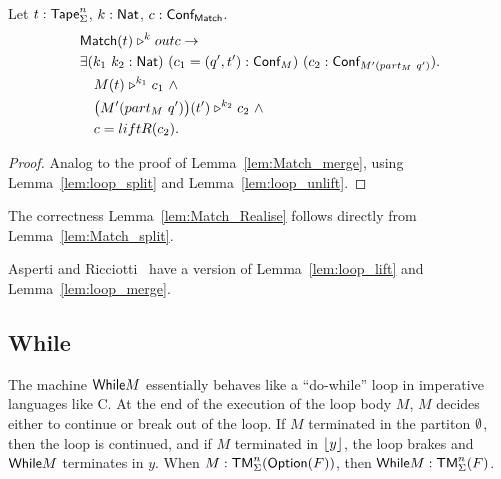 \begin{lemma}
  \label{lem:Match_split}
  Let $t : \textsf{Tape}_\Sigma^n$, $k : \textsf{Nat}$, $c : \textsf{Conf}_{\textsf{Match}}$.
  \begin{align*}
    & \textsf{Match}(t) \mathrel{\triangleright}^k outc \rightarrow \\
    & \exists (k_1~k_2 : \textsf{Nat})~(c_1 = (q', t') : \textsf{Conf}_M)~(c_2 : \textsf{Conf}_{M'(part_M~q')}). \\
    & \quad M(t) \mathrel{\triangleright}^{k_1} c_1 ~\land~ \\
    & \quad \bigl( M' (part_M~q') \bigr) (t') \mathrel{\triangleright}^{k_2} c_2 ~\land~ \\
    & \quad c = liftR(c_2).
  \end{align*}
\end{lemma}
\begin{proof}
  Analog to the proof of Lemma~\ref{lem:Match_merge}, using Lemma~\ref{lem:loop_split} and Lemma~\ref{lem:loop_unlift}.
\end{proof}
The correctness Lemma~\ref{lem:Match_Realise} follows directly from Lemma~\ref{lem:Match_split}.


Asperti and Ricciotti~\cite{asperti2015} have a version of Lemma~\ref{lem:loop_lift} and Lemma~\ref{lem:loop_merge}.

\subsection{While}
\label{sec:While}


The machine $\textsf{While} M$ essentially behaves like a ``do-while'' loop in imperative languages like C.  At the end of the execution of the loop body $M$,
$M$ decides either to continue or break out of the loop.  If $M$ terminated in the partiton $\emptyset$, then the loop is continued, and if $M$ terminated
in $\left\lfloor {y} \right\rfloor$, the loop brakes and $\textsf{While} M$ terminates in $y$.  When $M : \textsf{TM}_\Sigma^n(\textsf{Option}(F))$, then $\textsf{While} M : \textsf{TM}_\Sigma^n(F)$.


